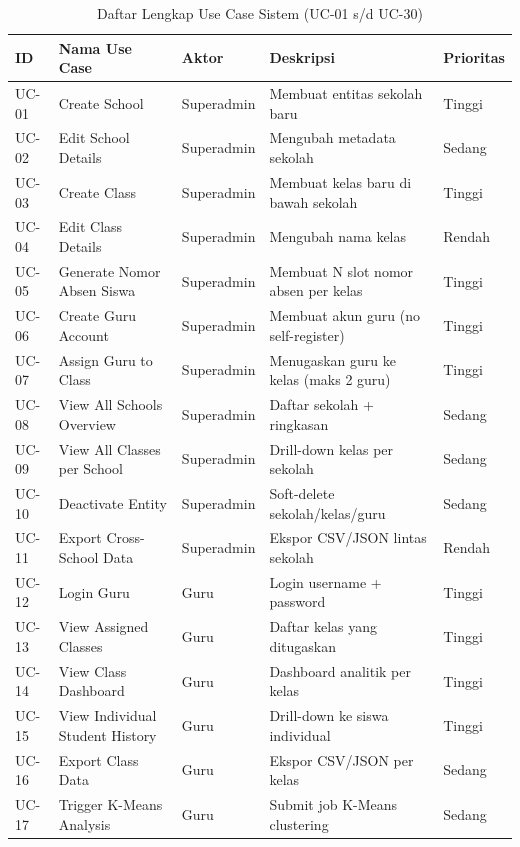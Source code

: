 \documentclass[12pt,a4paper,oneside,openany]{report}
\begin{document}
\begin{table}[H]
\centering
\caption{Daftar Lengkap Use Case Sistem (UC-01 s/d UC-30)}
\label{tab:use-case-lengkap}
\begin{tabular}{|p{1cm}|p{3.8cm}|p{2.5cm}|p{5cm}|p{1.2cm}|}
\hline
\textbf{ID} & \textbf{Nama Use Case} & \textbf{Aktor} & \textbf{Deskripsi} & \textbf{Prioritas} \\ \hline
UC-01 & Create School & Superadmin & Membuat entitas sekolah baru & Tinggi \\ \hline
UC-02 & Edit School Details & Superadmin & Mengubah metadata sekolah & Sedang \\ \hline
UC-03 & Create Class & Superadmin & Membuat kelas baru di bawah sekolah & Tinggi \\ \hline
UC-04 & Edit Class Details & Superadmin & Mengubah nama kelas & Rendah \\ \hline
UC-05 & Generate Nomor Absen Siswa & Superadmin & Membuat N slot nomor absen per kelas & Tinggi \\ \hline
UC-06 & Create Guru Account & Superadmin & Membuat akun guru (no self-register) & Tinggi \\ \hline
UC-07 & Assign Guru to Class & Superadmin & Menugaskan guru ke kelas (maks 2 guru) & Tinggi \\ \hline
UC-08 & View All Schools Overview & Superadmin & Daftar sekolah + ringkasan & Sedang \\ \hline
UC-09 & View All Classes per School & Superadmin & Drill-down kelas per sekolah & Sedang \\ \hline
UC-10 & Deactivate Entity & Superadmin & Soft-delete sekolah/kelas/guru & Sedang \\ \hline
UC-11 & Export Cross-School Data & Superadmin & Ekspor CSV/JSON lintas sekolah & Rendah \\ \hline
UC-12 & Login Guru & Guru & Login username + password & Tinggi \\ \hline
UC-13 & View Assigned Classes & Guru & Daftar kelas yang ditugaskan & Tinggi \\ \hline
UC-14 & View Class Dashboard & Guru & Dashboard analitik per kelas & Tinggi \\ \hline
UC-15 & View Individual Student History & Guru & Drill-down ke siswa individual & Tinggi \\ \hline
UC-16 & Export Class Data & Guru & Ekspor CSV/JSON per kelas & Sedang \\ \hline
UC-17 & Trigger K-Means Analysis & Guru & Submit job K-Means clustering & Sedang \\ \hline

\end{tabular}
\end{table}
\end{document}
